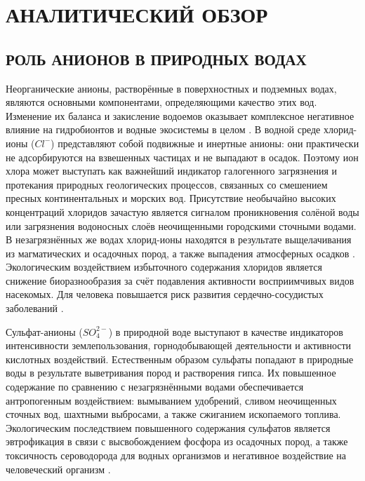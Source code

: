 \chapter{АНАЛИТИЧЕСКИЙ ОБЗОР}


\section{РОЛЬ АНИОНОВ В ПРИРОДНЫХ ВОДАХ} %

Неорганические анионы, растворённые в поверхностных и подземных водах, являются основными компонентами, определяющими качество этих вод. Изменение их баланса и закисление водоемов оказывает комплексное негативное влияние на гидробионтов и водные экосистемы в целом \cite{figuerolaReviewMetaAnalysisPotential2021}. В водной среде хлорид-ионы ($Cl^-$) представляют собой подвижные и инертные анионы: они практически не адсорбируются на взвешенных частицах и не выпадают в осадок. Поэтому ион хлора может выступать как важнейший индикатор галогенного загрязнения и протекания природных геологических процессов, связанных со смешением пресных континентальных и морских вод. Присутствие необычайно высоких концентраций хлоридов зачастую является сигналом проникновения солёной воды или загрязнения водоносных слоёв неочищенными городскими сточными водами. В незагрязнённых же водах хлорид-ионы находятся в результате выщелачивания из магматических и осадочных пород, а также выпадения атмосферных осадков \cite{pobozyApplicationCapillaryElectrophoresis2021b, wuReviewChlorideIon2021}. Экологическим воздействием избыточного содержания хлоридов является снижение биоразнообразия за счёт подавления активности восприимчивых видов насекомых. Для человека повышается риск развития сердечно-сосудистых заболеваний \cite{kaushalFreshwaterSalinizationSyndrome2021}.

Сульфат-анионы ($SO_4^{2-}$) в природной воде выступают в качестве индикаторов интенсивности землепользования, горнодобывающей деятельности и активности кислотных воздействий. Естественным образом сульфаты попадают в природные воды в результате выветривания пород и растворения гипса. Их повышенное содержание по сравнению с незагрязнёнными водами обеспечивается антропогенным воздействием: вымыванием удобрений, сливом неочищенных сточных вод, шахтными выбросами, а также сжиганием ископаемого топлива. Экологическим последствием повышенного содержания сульфатов является эвтрофикация в связи с высвобождением фосфора из осадочных пород, а также токсичность сероводорода для водных организмов и негативное воздействие на человеческий организм \cite{kaushalFreshwaterSalinizationSyndrome2021}.

